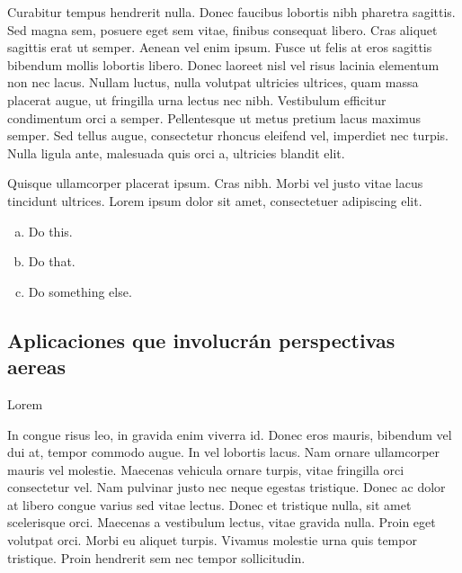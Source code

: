 \documentclass{article}
\begin{document}
Curabitur tempus hendrerit nulla. Donec faucibus lobortis nibh pharetra sagittis. Sed magna sem, posuere eget sem vitae, finibus consequat libero. Cras aliquet sagittis erat ut semper. Aenean vel enim ipsum. Fusce ut felis at eros sagittis bibendum mollis lobortis libero. Donec laoreet nisl vel risus lacinia elementum non nec lacus. Nullam luctus, nulla volutpat ultricies ultrices, quam massa placerat augue, ut fringilla urna lectus nec nibh. Vestibulum efficitur condimentum orci a semper. Pellentesque ut metus pretium lacus maximus semper. Sed tellus augue, consectetur rhoncus eleifend vel, imperdiet nec turpis. Nulla ligula ante, malesuada quis orci a, ultricies blandit elit.

\begin{question}
	Quisque ullamcorper placerat ipsum. Cras nibh. Morbi vel justo vitae lacus tincidunt ultrices. Lorem ipsum dolor sit amet, consectetuer adipiscing elit.

	\begin{enumerate}[(a)]
		\item Do this.
		\item Do that.
		\item Do something else.
	\end{enumerate}
\end{question}
	

\subsection{Aplicaciones que involucrán perspectivas aereas}

Lorem\\

\begin{question}
  In congue risus leo, in gravida enim viverra id. Donec eros mauris, bibendum vel dui at, tempor commodo augue. In vel lobortis lacus. Nam ornare ullamcorper mauris vel molestie. Maecenas vehicula ornare turpis, vitae fringilla orci consectetur vel. Nam pulvinar justo nec neque egestas tristique. Donec ac dolor at libero congue varius sed vitae lectus. Donec et tristique nulla, sit amet scelerisque orci. Maecenas a vestibulum lectus, vitae gravida nulla. Proin eget volutpat orci. Morbi eu aliquet turpis. Vivamus molestie urna quis tempor tristique. Proin hendrerit sem nec tempor sollicitudin.
\end{question}
\end{document}
